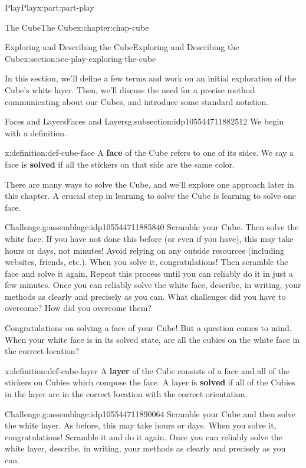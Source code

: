 \documentclass[oneside,10pt,]{book}
\newcommand{\terminology}[1]{\textbf{#1}}
\numberwithin{equation}{section}
\begin{document}
\begin{partptx}{Play}{}{Play}{}{}{x:part:part-play}
\begin{chapterptx}{The Cube}{}{The Cube}{}{}{x:chapter:chap-cube}
\begin{sectionptx}{Exploring and Describing the Cube}{}{Exploring and Describing the Cube}{}{}{x:section:sec-play-exploring-the-cube}
\begin{introduction}{}
In this section, we'll define a few terms and work on an initial exploration of the Cube's white layer. Then, we'll discuss the need for a precise method communicating about our Cubes, and introduce some standard notation.%
\end{introduction}%
%
%
\typeout{************************************************}
\typeout{************************************************}
%
\begin{subsectionptx}{Faces and Layers}{}{Faces and Layers}{}{}{g:subsection:idp105544711882512}
We begin with a definition.%
\begin{definition}{}{x:definition:def-cube-face}%
%
A \terminology{face} of the Cube refers to one of its sides. We say a face is \terminology{solved} if all the stickers on that side are the same color.%
\end{definition}
There are many ways to solve the Cube, and we'll explore one approach later in this chapter. A crucial step in learning to solve the Cube is learning to solve one face.%
\begin{assemblage}{Challenge.}{g:assemblage:idp105544711885840}%
Scramble your Cube. Then solve the white face. If you have not done this before (or even if you have), this may take hours or days, not minutes! Avoid relying on any outside resources (including websites, friends, etc.). When you solve it, congratulations! Then scramble the face and solve it again. Repeat this process until you can reliably do it in just a few minutes. Once you can reliably solve the white face, describe, in writing, your methods as clearly and precisely as you can. What challenges did you have to overcome? How did you overcome them?%
\end{assemblage}
Congratulations on solving a face of your Cube! But a question comes to mind. When your white face is in its solved state, are all the cubies on the white face in the correct location?%
\begin{definition}{}{x:definition:def-cube-layer}%
%
A \terminology{layer} of the Cube consists of a face and all of the stickers on Cubies which compose the face. A layer is \terminology{solved} if all of the Cubies in the layer are in the correct location with the correct orientation.%
\end{definition}
\begin{assemblage}{Challenge.}{g:assemblage:idp105544711890064}%
Scramble your Cube and then solve the white layer. As before, this may take hours or days. When you solve it, congratulations! Scramble it and do it again. Once you can reliably solve the white layer, describe, in writing, your methods as clearly and precisely as you can.%

\end{assemblage}
\end{subsectionptx}
\end{sectionptx}
\end{chapterptx}
\end{partptx}
\end{document}
